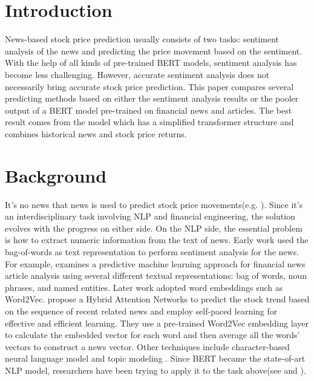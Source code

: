 \documentclass[11pt]{article}
\begin{document}
\section{Introduction}

News-based stock price prediction usually consists of two tasks: sentiment analysis of the news and predicting the price movement based on the sentiment. With the help of all kinds of pre-trained BERT models, sentiment analysis has become less challenging. However, accurate sentiment analysis does not necessarily bring accurate stock price prediction. This paper compares several predicting methods based on either the sentiment analysis results or the pooler output of a BERT model pre-trained on financial news and articles. The best result comes from the model which has a simplified transformer structure and combines historical news and stock price returns. 

\section{Background}

It's no news that news is used to predict stock price movements(e.g. \citealp{Tetlock:2007}). Since it's an interdisciplinary task involving NLP and financial engineering, the solution evolves with the progress on either side. On the NLP side, the essential problem is how to extract numeric information from the text of news. Early work used the bag-of-words as text representation to perform sentiment analysis for the news. For example, \citet{Schumaker:2009} examines a predictive machine learning approach for financial news article analysis using several different textual representations: bag of words, noun phrases, and named entities. Later work adopted word embeddings such as Word2Vec.\citet{Hu:2018} propose a Hybrid Attention Networks to predict the stock trend based on the sequence of recent related news and employ self-paced learning for effective and efficient learning. They use a pre-trained Word2Vec embedding layer to calculate the embedded vector for each word and then average all the words' vectors to construct a news vector. Other techniques include character-based neural language model \citep{dos-santos-pinheiro-dras-2017-stock} and topic modeling \citep{nguyen-shirai-2015-topic}. Since BERT became the state-of-art NLP model, researchers have been trying to apply it to the task above(see \citet{sawhney-etal-2021-quantitative} and \citet{tsutsumi-utsuro-2022-detecting}). 
\end{document}
